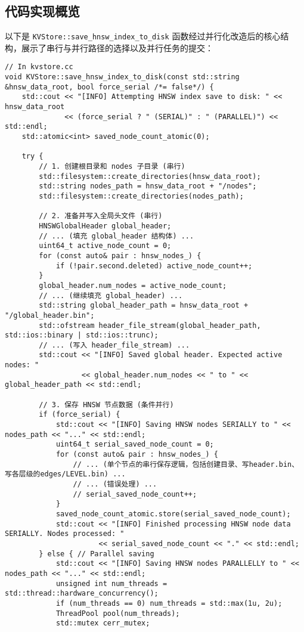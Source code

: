 \documentclass{ctexart} %
\begin{document}
\subsection{代码实现概览}
以下是 \texttt{KVStore::save_hnsw_index_to_disk} 函数经过并行化改造后的核心结构，展示了串行与并行路径的选择以及并行任务的提交：
\begin{verbatim}
// In kvstore.cc
void KVStore::save_hnsw_index_to_disk(const std::string &hnsw_data_root, bool force_serial /*= false*/) {
    std::cout << "[INFO] Attempting HNSW index save to disk: " << hnsw_data_root 
              << (force_serial ? " (SERIAL)" : " (PARALLEL)") << std::endl;
    std::atomic<int> saved_node_count_atomic(0); 

    try {
        // 1. 创建根目录和 nodes 子目录 (串行)
        std::filesystem::create_directories(hnsw_data_root);
        std::string nodes_path = hnsw_data_root + "/nodes";
        std::filesystem::create_directories(nodes_path);

        // 2. 准备并写入全局头文件 (串行)
        HNSWGlobalHeader global_header;
        // ... (填充 global_header 结构体) ...
        uint64_t active_node_count = 0;
        for (const auto& pair : hnsw_nodes_) {
            if (!pair.second.deleted) active_node_count++;
        }
        global_header.num_nodes = active_node_count;
        // ... (继续填充 global_header) ...
        std::string global_header_path = hnsw_data_root + "/global_header.bin";
        std::ofstream header_file_stream(global_header_path, std::ios::binary | std::ios::trunc);
        // ... (写入 header_file_stream) ...
        std::cout << "[INFO] Saved global header. Expected active nodes: " 
                  << global_header.num_nodes << " to " << global_header_path << std::endl;

        // 3. 保存 HNSW 节点数据 (条件并行)
        if (force_serial) {
            std::cout << "[INFO] Saving HNSW nodes SERIALLY to " << nodes_path << "..." << std::endl;
            uint64_t serial_saved_node_count = 0; 
            for (const auto& pair : hnsw_nodes_) {
                // ... (单个节点的串行保存逻辑，包括创建目录、写header.bin、写各层级的edges/LEVEL.bin) ...
                // ... (错误处理) ...
                // serial_saved_node_count++;
            }
            saved_node_count_atomic.store(serial_saved_node_count);
            std::cout << "[INFO] Finished processing HNSW node data SERIALLY. Nodes processed: " 
                      << serial_saved_node_count << "." << std::endl;
        } else { // Parallel saving
            std::cout << "[INFO] Saving HNSW nodes PARALLELLY to " << nodes_path << "..." << std::endl;
            unsigned int num_threads = std::thread::hardware_concurrency();
            if (num_threads == 0) num_threads = std::max(1u, 2u); 
            ThreadPool pool(num_threads);
            std::mutex cerr_mutex; 


\end{verbatim}
\end{document}
